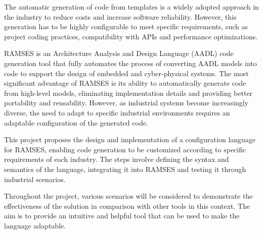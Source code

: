 
%

The automatic generation of code from templates is a widely adopted approach in the industry to reduce costs and increase software reliability. However, this generation has to be highly configurable to meet specific requirements, such as project coding practices, compatibility with APIs and performance optimizations.

RAMSES is an Architecture Analysis and Design Language (AADL) code generation tool that fully automates the process of converting AADL models into code to support the design of embedded and cyber-physical systems. The most significant advantage of RAMSES is its ability to automatically generate code from high-level models, eliminating implementation details and providing better portability and reusability. However, as industrial systems become increasingly diverse, the need to adapt to specific industrial environments requires an adaptable configuration of the generated code.

This project proposes the design and implementation of a configuration language for RAMSES, enabling code generation to be customized according to specific requirements of each industry. The steps involve defining the syntax and semantics of the language, integrating it into RAMSES and testing it through industrial scenarios.

Throughout the project, various scenarios will be considered to demonstrate the effectiveness of the solution in comparison with other tools in this context. The aim is to provide an intuitive and helpful tool that can be used to make the language adaptable.


